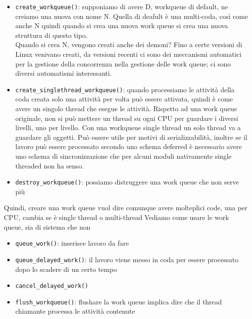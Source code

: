 \documentclass[12pt, oneside]{extbook}
\begin{document}
\begin{itemize}
\item \texttt{create\_workqueue()}: supponiamo di avere D, workqueue di default, ne creiamo una nuova con nome N. Quella di deafult è una multi-coda, così come anche N quindi quando si crea una nuova work queue si crea una nuova struttura di questo tipo.\\Quando si crea N, vengono creati anche dei demoni? Fino a certe versioni di Linux venivano creati, da versioni recenti ci sono dei meccanismi automatici per la gestione della concorrenza nella gestione delle work queue; ci sono diversi automatismi interessanti.
\item \texttt{create\_singlethread\_workqueue()}: quando processiamo le attività della coda creata solo una attività per volta può essere attivata, quindi è come avere un singolo thread che esegue le attività. Rispetto ad una work queue originale, non si può mettere un thread su ogni CPU per guardare i diversi livelli, uno per livello. Con una workqueue single thread un solo thread va a guardare gli oggetti. Può essere utile per motivi di serializzabilità, inoltre se il lavoro può essere processato secondo uno schema deferred è necessario avere uno schema di sincronizzazione che per alcuni moduli nativamente single threaded non ha senso.
\item \texttt{destroy\_workqueue()}: possiamo distruggere una work queue che non serve più
\end{itemize}
Quindi, creare una work queue vuol dire comunque avere molteplici code, una per CPU, cambia se è single thread o multi-thread
Vediamo come usare le work queue, sia di sistema che non
\begin{itemize}
\item \texttt{queue\_work()}: inserisce lavoro da fare
\item \texttt{queue\_delayed\_work()}: il lavoro viene messo in coda per essere processato dopo lo scadere di un certo tempo
\item \texttt{cancel\_delayed\_work()}
\item \texttt{flush\_workqueue()}: flushare la work queue implica dire che il thread chiamante processa le attività contenute
\end{itemize}
\end{document}
